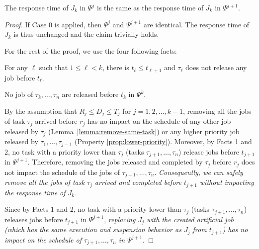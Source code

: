 \begin{Lemma}
\label{lemma:psij}
The response time of $J_k$ in $\Psi^j$ is the same as the response time of $J_k$ in $\Psi^{j+1}$.
\end{Lemma}
\begin{proof}
If Case 0 is applied, then $\Psi^j$ and $\Psi^{j+1}$ are identical. The response time of $J_k$ is thus unchanged and the claim trivially holds.

For the rest of the proof, we use the four following facts:

 For any $\ell$ such that $1 \leq \ell < k$, there is $t_\ell \leq t_{\ell+1}$ and $\tau_\ell$ does not release any job before $t_\ell$.

 No job of $\tau_k, \ldots, \tau_n$ are released before $t_k$ in $\Psi^k$.

 By the assumption that $R_j \leq D_j \leq T_j$ for $j=1,2,\ldots,k-1$, removing all the jobs of task $\tau_j$ arrived before $r_j$ has no impact on the schedule of any other job released by $\tau_j$ (Lemma~\ref{lemma:remove-same-task}) or any higher priority job released by $\tau_1, \ldots, \tau_{j-1}$ (Property \ref{prop:lower-priority}). Moreover, by Facts 1 and 2, no task with a priority lower than $\tau_j$ (tasks $\tau_{j+1}, \ldots, \tau_n$) release jobs before $t_{j+1}$ in $\Psi^{j+1}$. Therefore, removing the jobs released and completed by $\tau_j$ before $r_j$ does not impact the schedule of the jobs of $\tau_{j+1}, \ldots, \tau_{n}$. \emph{Consequently, we can safely remove all the jobs of task $\tau_j$ arrived and completed before $t_{j+1}$ without impacting the response time of $J_{k}$.}

 Since by Facts 1 and 2, no task with a priority lower than $\tau_j$ (tasks $\tau_{j+1}, \ldots, \tau_n$) releases jobs before $t_{j+1}$ in $\Psi^{j+1}$, \emph{replacing $J_j$ with the created artificial job (which has the same execution and suspension behavior as $J_j$ from $t_{j+1}$) has no impact on the schedule of $\tau_{j+1}, \ldots, \tau_n$ in $\Psi^{j+1}$.}



\end{proof}
